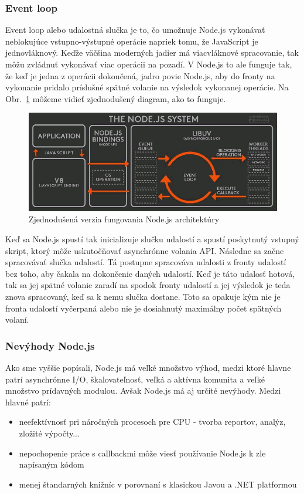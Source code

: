 \subsubsection{Event loop}
\indent Event loop alebo udalostná slučka je to, čo umožnuje Node.js vykonávať neblokujúce vstupno-výstupné operácie napriek tomu, že JavaScript je jednovláknový. Keďže väčšina moderných jadier má viacvláknové spracovanie, tak môžu zvládnuť vykonávať viac operácii na pozadí. V Node.js to ale funguje tak, že keď je jedna z operácii dokončená, jadro povie Node.js, aby do fronty na vykonanie pridalo príslušné spätné volanie na výsledok vykonanej operácie. Na Obr.~\ref{fig:event_loop} môžeme vidieť zjednodušený diagram, ako to funguje. 

\begin{figure}[H]
    \centering
    \includegraphics[scale=0.55]{img/evet_loop.jpg}
    \caption{Zjednodušená verzia fungovania Node.js architektúry\cite{nodejs_2}}
    \label{fig:event_loop}
\end{figure}

\indent Keď sa Node.js spustí tak inicializuje slučku udalostí a spustí poskytnutý vstupný skript, ktorý môže uskutočňovať asynchrónne volania API. Následne sa začne spracovávať slučka udalostí. Tá postupne spracováva udalosti z fronty udalostí bez toho, aby čakala na dokončenie daných udalostí. Keď je táto udalosť hotová, tak sa jej spätné volanie zaradí na spodok fronty udalostí a jej výsledok je teda znova spracovaný, keď sa k nemu slučka dostane. Toto sa opakuje kým nie je fronta udalostí vyčerpaná alebo nie je dosiahnutý maximálny počet spätných volaní\cite{nodejs_2}. 

\subsubsection{Nevýhody Node.js}
\indent Ako sme vyššie popísali, Node.js má veľké množstvo výhod, medzi ktoré hlavne patrí asynchrónne I/O, škalovateľnosť, veľká a aktívna komunita a veľké množstvo prídavných modulou. Avšak Node.js má aj určité nevýhody. Medzi hlavné patrí:
\begin{itemize}
    \item neefektívnosť pri náročných procesoch pre CPU - tvorba reportov, analýz, zložité výpočty... 
    \item nepochopenie práce s callbackmi môže viesť používanie Node.js k zle napísaným kódom
    \item menej štandarných knižníc v porovnaní s klasickou Javou a .NET platformou
\end{itemize}


